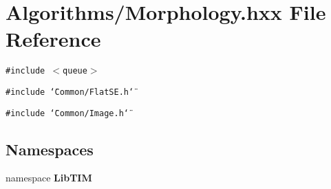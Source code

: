 \section{Algorithms/Morphology.hxx File Reference}
\label{Morphology_8hxx}
{\tt \#include $<$queue$>$}\par
{\tt \#include \char`\"{}Common/Flat\-SE.h\char`\"{}}\par
{\tt \#include \char`\"{}Common/Image.h\char`\"{}}\par
\subsection*{Namespaces}
\begin{CompactItemize}
\item 
namespace {\bf Lib\-TIM}
\end{CompactItemize}

